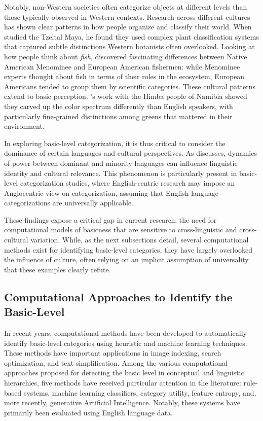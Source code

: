 \documentclass[preprint,12pt,authoryear]{elsarticle}
\begin{document}
Notably, non-Western societies often categorize objects at different levels than those typically observed in Western contexts. Research across different cultures has shown clear patterns in how people organize and classify their world. When \citet{riviere_principles_1975} studied the Tzeltal Maya, he found they used complex plant classification systems that captured subtle distinctions Western botanists often overlooked. Looking at how people think about \textit{fish}, \citet{medin_folkbiology_2006} discovered fascinating differences between Native American Menominee and European American fishermen: while Menominee experts thought about fish in terms of their roles in the ecosystem, European Americans tended to group them by scientific categories. These cultural patterns extend to basic perception. \citet{roberson_colour_2006}'s work with the Himba people of Namibia showed they carved up the color spectrum differently than English speakers, with particularly fine-grained distinctions among greens that mattered in their environment.

In exploring basic-level categorization, it is thus critical to consider the dominance of certain languages and cultural perspectives. As \citet{kim_exploring_2003} discusses, dynamics of power between dominant and minority languages can influence linguistic identity and cultural relevance. This phenomenon is particularly present in basic-level categorization studies, where English-centric research may impose an Anglocentric view on categorization, assuming that English-language categorizations are universally applicable. 

These findings expose a critical gap in current research: the need for computational models of basicness that are sensitive to cross-linguistic and cross-cultural variation. While, as the next subsections detail, several computational methods exist for identifying basic-level categories, they have largely overlooked the influence of culture, often relying on an implicit assumption of universality that these examples clearly refute.

\subsection{Computational Approaches to Identify the Basic-Level}

In recent years, computational methods have been developed to automatically identify basic-level categories using heuristic and machine learning techniques. These methods have important applications in image indexing, search optimization, and text simplification. Among the various computational approaches proposed for detecting the basic level in conceptual and linguistic hierarchies, five methods have received particular attention in the literature: rule-based systems, machine learning classifiers, category utility, feature entropy, and, more recently, generative Artificial Intelligence. Notably, these systems have primarily been evaluated using English language data.
\end{document}
